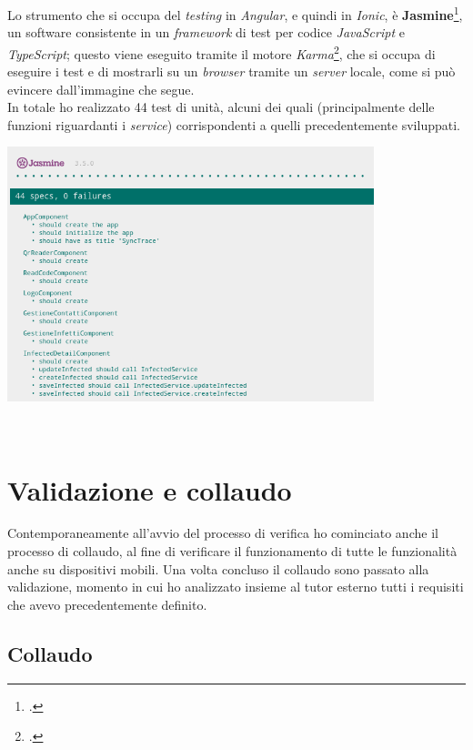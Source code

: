 Lo strumento che si occupa del \textit{testing} in \textit{Angular}, e quindi in \textit{Ionic}, è \textbf{Jasmine}\footcite{tec:jasmine}, un software consistente in un \textit{framework} di test per codice \textit{JavaScript} e \textit{TypeScript}; questo viene eseguito tramite il motore \textit{Karma}\footcite{tec:karma}, che si occupa di eseguire i test e di mostrarli su un \textit{browser} tramite un \textit{server} locale, come si può evincere dall'immagine che segue. \\
In totale ho realizzato 44 test di unità, alcuni dei quali (principalmente delle funzioni riguardanti i \textit{service}) corrispondenti a quelli precedentemente sviluppati. \newpage

\begin{minipage}{\linewidth}
  \centering
    \includegraphics[height=7.4cm]{immagini/jasminekarma}
\end{minipage} \\



\section{Validazione e collaudo}

Contemporaneamente all'avvio del processo di verifica ho cominciato anche il processo di collaudo, al fine di verificare il funzionamento di tutte le funzionalità anche su dispositivi mobili. Una volta concluso il collaudo sono passato alla validazione, momento in cui ho analizzato insieme al tutor esterno tutti i requisiti che avevo precedentemente definito.

\subsection*{Collaudo}

